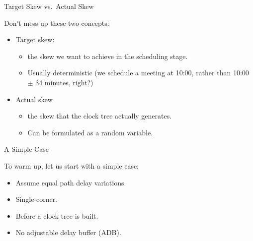 \documentclass[10pt,ignorenonframetext,mathserif,onlymath]{beamer}
\providecommand{\tightlist}{%
  \setlength{\itemsep}{0pt}\setlength{\parskip}{0pt}}
\begin{document}
\begin{frame}{Target Skew vs.~Actual Skew}
\protect\hypertarget{target-skew-vs.actual-skew}{}

Don’t mess up these two concepts:

\begin{itemize}
\tightlist
\item
  Target skew:

  \begin{itemize}
  \tightlist
  \item
    the skew we want to achieve in the scheduling stage.
  \item
    Usually deterministic (we schedule a meeting at 10:00, rather than
    10:00 \(\pm\) 34 minutes, right?)
  \end{itemize}
\item
  Actual skew

  \begin{itemize}
  \tightlist
  \item
    the skew that the clock tree actually generates.
  \item
    Can be formulated as a random variable.
  \end{itemize}
\end{itemize}

\end{frame}

\begin{frame}{A Simple Case}
\protect\hypertarget{a-simple-case}{}

To warm up, let us start with a simple case:

\begin{itemize}
\tightlist
\item
  Assume equal path delay variations.
\item
  Single-corner.
\item
  Before a clock tree is built.
\item
  No adjustable delay buffer (ADB).
\end{itemize}

\end{frame}
\end{document}
